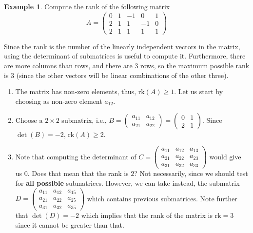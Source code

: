 \documentclass[a4paper,11pt]{article}
\theoremstyle{definition}
\newtheorem{example}{Example}
\theoremstyle{plain}
\begin{document}
\begin{example}
Compute the rank of the following matrix \[
A = \begin{pmatrix} 0 & 1 & -1 & 0 & 1 \\ 2 & 1 & 1 & -1 & 0 \\ 2 & 1 & 1 & 1 & 1 \end{pmatrix}
\]

Since the rank is the number of the linearly independent vectors in the
matrix, using the determinant of submatrices is useful to compute it.
Furthermore, there are more columns than rows, and there are \(3\) rows,
so the maximum possible rank is \(3\) (since the other vectors will be
linear combinations of the other three).

\begin{enumerate}
\def\labelenumi{\arabic{enumi}.}
\item
  The matrix has non-zero elements, thus, \(\text{rk}(A) \geq 1\). Let
  us start by choosing as non-zero element \(a_{12}\).
\item
  Choose a \(2\times 2\) submatrix, i.e.,
  \(B = \begin{pmatrix} a_{11} & a_{12} \\ a_{21} & a_{22} \end{pmatrix} = \begin{pmatrix} 0 & 1 \\ 2 & 1 \end{pmatrix}\).
  Since \(\det(B) = -2\), \(\text{rk}(A) \geq 2\).
\item
  Note that computing the determinant of
  \(C = \begin{pmatrix} a_{11} & a_{12} & a_{13}\\ a_{21} & a_{22} & a_{23} \\ a_{31} & a_{32} & a_{33}\end{pmatrix}\)
  would give us \(0\). Does that mean that the rank is \(2\)? Not
  necessarily, since we should test for \textbf{all possible}
  submatrices. However, we can take instead, the submatrix
  \(D = \begin{pmatrix} a_{11} & a_{12} & a_{15}\\ a_{21} & a_{22} & a_{25} \\ a_{31} & a_{32} & a_{35}\end{pmatrix}\)
  which contains previous submatrices. Note further that
  \(\det(D) = -2\) which implies that the rank of the matrix is
  \(\text{rk} = 3\) since it cannot be greater than that.
\end{enumerate}
\end{example}
\end{document}
